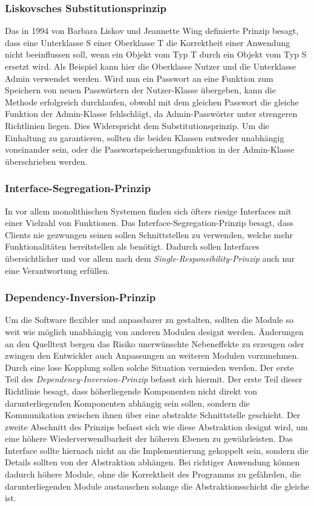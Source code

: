 \documentclass[conference]{IEEEtran}
\begin{document}
\subsubsection{Liskovsches Substitutionsprinzip} Das in 1994 von Barbara Liskov und Jeannette Wing definierte Prinzip besagt, dass eine Unterklasse S einer Oberklasse T die Korrektheit einer Anwendung nicht beeinflussen soll, wenn ein Objekt vom Typ T durch ein Objekt vom Typ S ersetzt wird. Als Beispiel kann hier die Oberklasse Nutzer und die Unterklasse Admin verwendet werden. Wird nun ein Passwort an eine Funktion zum Speichern von neuen Passwörtern der Nutzer-Klasse übergeben, kann die Methode erfolgreich durchlaufen, obwohl mit dem gleichen Passwort die gleiche Funktion der Admin-Klasse fehlschlägt, da Admin-Passwörter unter strengeren Richtlinien liegen. Dies Widerspricht dem Substitutionsprinzip. Um die Einhaltung zu garantieren, sollten die beiden Klassen entweder unabhängig voneinander sein, oder die Passwortspeicherungsfunktion in der Admin-Klasse überschrieben werden.

\subsubsection{Interface-Segregation-Prinzip} In vor allem monolithischen Systemen finden sich öfters riesige Interfaces mit einer Vielzahl von Funktionen. Das Interface-Segregation-Prinzip besagt, dass Clients nie gezwungen seinen sollen Schnittstellen zu verwenden, welche mehr Funktionalitäten bereitstellen als benötigt. Dadurch sollen Interfaces übersichtlicher und vor allem nach dem \emph{Single-Responsibility-Prinzip} auch nur eine Verantwortung erfüllen.

\subsubsection{Dependency-Inversion-Prinzip} Um die Software flexibler und anpassbarer zu gestalten, sollten die Module   so weit wie möglich unabhängig von anderen Modulen designt werden. Änderungen an den Quelltext bergen das Risiko unerwünschte Nebeneffekte zu erzeugen oder zwingen den Entwickler auch Anpassungen an weiteren Modulen vorzunehmen. Durch eine lose Kopplung sollen solche Situation vermieden werden. Der erste Teil des \emph{Dependency-Inversion-Prinzip} befasst sich hiermit. Der erste Teil dieser Richtlinie besagt, dass höherliegende Komponenten nicht direkt von darunterliegenden Komponenten abhängig sein sollen, sondern die Kommunikation zwischen ihnen über eine abstrakte Schnittstelle geschieht. Der zweite Abschnitt des Prinzips befasst sich wie diese Abstraktion designt wird, um eine höhere Wiederverwendbarkeit der höheren Ebenen zu gewährleisten. Das Interface sollte hiernach nicht an die Implementierung gekoppelt sein, sondern die Details sollten von der Abstraktion abhängen. Bei richtiger Anwendung können dadurch höhere Module, ohne die Korrektheit des Programms zu gefährden, die darunterliegenden Module austauschen solange die Abstraktionsschicht die gleiche ist.
\end{document}
